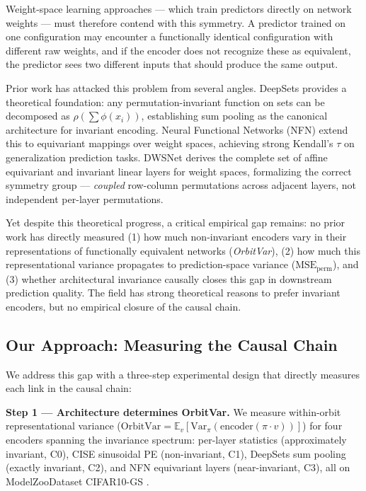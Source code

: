 Weight-space learning approaches --- which train predictors directly on network weights --- must therefore contend with this symmetry. A predictor trained on one configuration may encounter a functionally identical configuration with different raw weights, and if the encoder does not recognize these as equivalent, the predictor sees two different inputs that should produce the same output.

Prior work has attacked this problem from several angles. DeepSets \cite{Zaheer2017Deep} provides a theoretical foundation: any permutation-invariant function on sets can be decomposed as $\rho(\sum \phi(x_i))$, establishing sum pooling as the canonical architecture for invariant encoding. Neural Functional Networks (NFN) \cite{Zhou2023Permutation} extend this to equivariant mappings over weight spaces, achieving strong Kendall's $\tau$ on generalization prediction tasks. DWSNet \cite{Navon2023Equivariant} derives the complete set of affine equivariant and invariant linear layers for weight spaces, formalizing the correct symmetry group --- \emph{coupled} row-column permutations across adjacent layers, not independent per-layer permutations.

Yet despite this theoretical progress, a critical empirical gap remains: no prior work has directly measured (1) how much non-invariant encoders vary in their representations of functionally equivalent networks (\emph{OrbitVar}), (2) how much this representational variance propagates to prediction-space variance ($\text{MSE}_\text{perm}$), and (3) whether architectural invariance causally closes this gap in downstream prediction quality. The field has strong theoretical reasons to prefer invariant encoders, but no empirical closure of the causal chain.

\subsection{Our Approach: Measuring the Causal Chain}

We address this gap with a three-step experimental design that directly measures each link in the causal chain:

\textbf{Step 1 --- Architecture determines OrbitVar.} We measure within-orbit representational variance ($\text{OrbitVar} = \mathbb{E}_v[\text{Var}_\pi(\text{encoder}(\pi \cdot v))]$) for four encoders spanning the invariance spectrum: per-layer statistics (approximately invariant, C0), CISE sinusoidal PE (non-invariant, C1), DeepSets sum pooling (exactly invariant, C2), and NFN equivariant layers (near-invariant, C3), all on ModelZooDataset CIFAR10-GS \cite{Unterthiner2020Predicting}.

